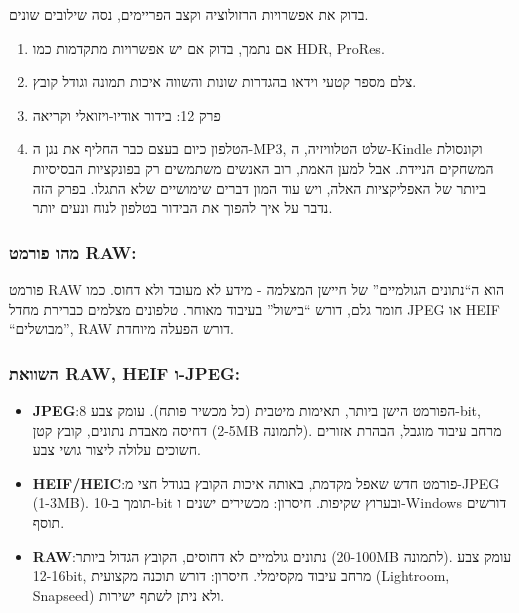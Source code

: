 \begin{tcbpractice}{בדוק את אפשרויות הרזולוציה וקצב הפריימים, נסה שילובים שונים.}
\begin{enumerate}
  \item אם נתמך, בדוק אם יש אפשרויות מתקדמות כמו HDR, ProRes.
  \item צלם מספר קטעי וידאו בהגדרות שונות והשווה איכות תמונה וגודל קובץ.
  \item פרק 12: בידור אודיו-ויזואלי וקריאה
  \item הטלפון כיום בעצם כבר החליף את נגן ה-MP3, שלט הטלוויזיה, ה-Kindle וקונסולת המשחקים הניידת. אבל למען האמת, רוב האנשים משתמשים רק בפונקציות הבסיסיות ביותר של האפליקציות האלה, ויש עוד המון דברים שימושיים שלא התגלו. בפרק הזה נדבר על איך להפוך את הבידור בטלפון לנוח ונעים יותר.
\end{enumerate}

\end{tcbpractice}


\subsubsection*{מהו פורמט RAW:}

פורמט RAW הוא ה“נתונים הגולמיים” של חיישן המצלמה - מידע לא מעובד ולא דחוס. כמו חומר גלם, דורש “בישול” בעיבוד מאוחר. טלפונים מצלמים כברירת מחדל JPEG או HEIF “מבושלים”, RAW דורש הפעלה מיוחדת.

\subsubsection*{השוואת RAW, HEIF ו-JPEG:}

\begin{itemize}
  \item \textbf{JPEG}:הפורמט הישן ביותר, תאימות מיטבית (כל מכשיר פותח). עומק צבע 8-bit, דחיסה מאבדת נתונים, קובץ קטן (2-5MB לתמונה). מרחב עיבוד מוגבל, הבהרת אזורים חשוכים עלולה ליצור גושי צבע.
  \item \textbf{HEIF/HEIC}:פורמט חדש שאפל מקדמת, באותה איכות הקובץ בגודל חצי מ-JPEG (1-3MB). תומך ב-10-bit ובערוץ שקיפות. חיסרון: מכשירים ישנים ו-Windows דורשים תוסף.
  \item \textbf{RAW}:נתונים גולמיים לא דחוסים, הקובץ הגדול ביותר (20-100MB לתמונה). עומק צבע 12-16bit, מרחב עיבוד מקסימלי. חיסרון: דורש תוכנה מקצועית (Lightroom, Snapseed) ולא ניתן לשתף ישירות.
\end{itemize}

